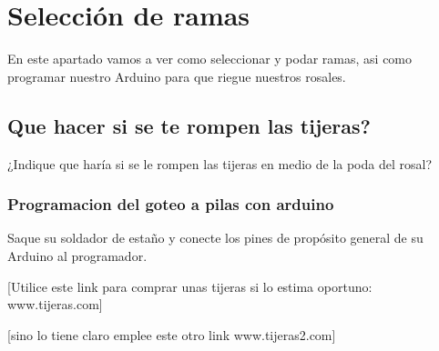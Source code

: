 \documentclass[12pt,a4paper]{article}
\begin{document}
\makeexamheader

\section{Selección de ramas}

En este apartado vamos a ver como seleccionar y podar ramas, asi como programar nuestro Arduino para que riegue nuestros rosales.

\subsection{Que hacer si se te rompen las tijeras? }
¿Indique que haría si se le rompen las tijeras en medio de la poda del rosal?


\subsubsection{Programacion del goteo a pilas con arduino}

Saque su soldador de estaño y conecte los pines de propósito general de su Arduino al programador.



[Utilice este link para comprar unas tijeras si lo estima oportuno: www.tijeras.com]

[sino lo tiene claro emplee este otro link www.tijeras2.com]
\end{document}
